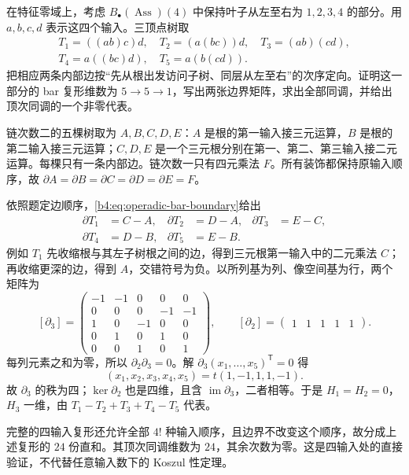 \begin{exercise}\label{b4:ex:G-ass-bar-four-inputs}
	在特征零域上，考虑 \(B_\bullet(\operatorname{Ass})(4)\) 中保持叶子从左至右为 \(1,2,3,4\) 的部分。用 \(a,b,c,d\) 表示这四个输入。三顶点树取
	\[
		\begin{gathered}
			T_1=((ab)c)d,\quad T_2=(a(bc))d,\quad T_3=(ab)(cd),\\
			T_4=a((bc)d),\quad T_5=a(b(cd)).
		\end{gathered}
	\]
	把相应两条内部边按“先从根出发访问子树、同层从左至右”的次序定向。证明这一部分的 bar 复形维数为 \(5\to5\to1\)，写出两张边界矩阵，求出全部同调，并给出顶次同调的一个非零代表。
\end{exercise}
\begin{solution}
	链次数二的五棵树取为 \(A,B,C,D,E\)：\(A\) 是根的第一输入接三元运算，\(B\) 是根的第二输入接三元运算；\(C,D,E\) 是一个三元根分别在第一、第二、第三输入接二元运算。每棵只有一条内部边。链次数一只有四元乘法 \(F\)。所有装饰都保持原输入顺序，故 \(\partial A=\partial B=\partial C=\partial D=\partial E=F\)。

	依照题定边顺序，\eqref{b4:eq:operadic-bar-boundary}给出
	\[
		\begin{aligned}
			\partial T_1&=C-A,&\partial T_2&=D-A,&\partial T_3&=E-C,\\
			\partial T_4&=D-B,&\partial T_5&=E-B.
		\end{aligned}
	\]
	例如 \(T_1\) 先收缩根与其左子树根之间的边，得到三元根第一输入中的二元乘法 \(C\)；再收缩更深的边，得到 \(A\)，交错符号为负。以所列基为列、像空间基为行，两个矩阵为
	\[
		[\partial_3]=
		\begin{pmatrix}
			-1&-1&0&0&0\\
			0&0&0&-1&-1\\
			1&0&-1&0&0\\
			0&1&0&1&0\\
			0&0&1&0&1
		\end{pmatrix},\qquad
		[\partial_2]=\begin{pmatrix}1&1&1&1&1\end{pmatrix}.
	\]
	每列元素之和为零，所以 \(\partial_2\partial_3=0\)。解 \(\partial_3(x_1,\ldots,x_5)^{\mathsf T}=0\) 得
	\[
		(x_1,x_2,x_3,x_4,x_5)=t(1,-1,1,1,-1).
	\]
	故 \(\partial_3\) 的秩为四；\(\ker\partial_2\) 也是四维，且含 \(\operatorname{im}\partial_3\)，二者相等。于是 \(H_1=H_2=0\)，\(H_3\) 一维，由 \(T_1-T_2+T_3+T_4-T_5\) 代表。

	完整的四输入复形还允许全部 \(4!\) 种输入顺序，且边界不改变这个顺序，故分成上述复形的 \(24\) 份直和。其顶次同调维数为 \(24\)，其余次数为零。这是四输入处的直接验证，不代替任意输入数下的 Koszul 性定理。
\end{solution}
